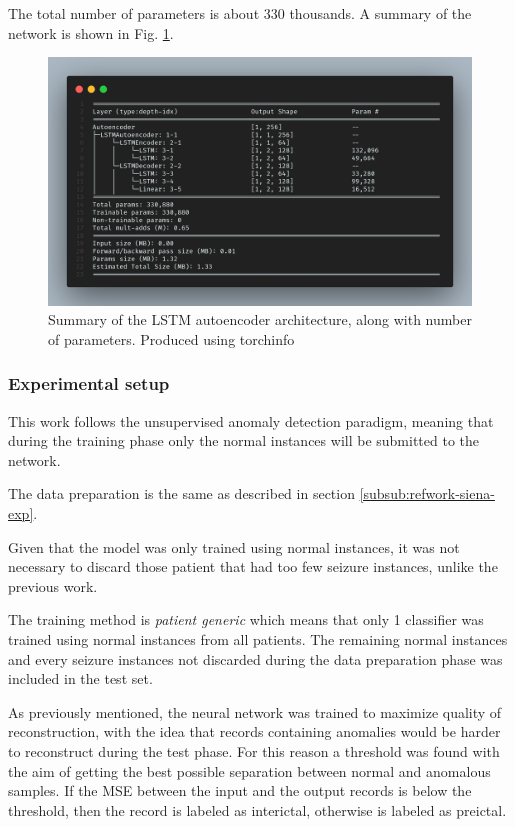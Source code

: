 The total number of parameters is about 330 thousands. A summary of the network is shown in Fig. \ref{fig:lstm-summary}.

\begin{figure}[ht]
    \centering
    \includegraphics[width=1.0\textwidth]{images/State-of-art/lstm-summary.png}
    \caption{Summary of the LSTM autoencoder architecture, along with number of parameters. Produced using torchinfo \cite{yep_torchinfo_2020}}
    \label{fig:lstm-summary}
\end{figure}

\subsubsection{Experimental setup} \label{subsub:refwork-uab-exp}
This work follows the unsupervised anomaly detection paradigm, meaning that during the training phase only the normal instances will be submitted to the network.

The data preparation is the same as described in section \ref{subsub:refwork-siena-exp}.

Given that the model was only trained using normal instances, it was not necessary to discard those patient that had too few seizure instances, unlike the previous work.

The training method is \textit{patient generic} which means that only 1 classifier was trained using normal instances from all patients. The remaining normal instances and every seizure instances not discarded during the data preparation phase was included in the test set.

As previously mentioned, the neural network was trained to maximize quality of reconstruction, with the idea that records containing anomalies would be harder to reconstruct during the test phase. For this reason a threshold was found with the aim of getting the best possible separation between normal and anomalous samples. If the \gls{MSE} between the input and the output records is below the threshold, then the record is labeled as interictal, otherwise is labeled as preictal.

